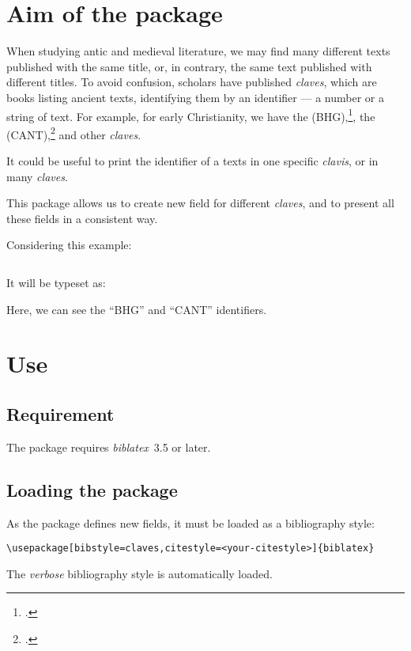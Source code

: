 \documentclass{ltxdockit}[2011/03/25]
\newcommand{\biblatex}{\emph{biblatex}\xspace}
\newcommand{\claves}{\emph{claves}\xspace}
\newcommand{\clavis}{\emph{clavis}\xspace}
\begin{document}
\printtitlepage
\tableofcontents


\section{Aim of the package}

When studying antic and medieval literature, we may find many different texts published with the same title, or, in contrary, the same text published with different titles.
To avoid confusion, scholars have published \claves, which are books listing ancient texts, identifying them by an identifier --- a number or a string of text.
For example, for early Christianity, we have the  (BHG),\footcites{BHG_3}{BHG_auctarium}{BHG_novum_auctarium}, the  (CANT),\footcite{CANT} and other \claves.
 
It could be useful to print the identifier of a texts in one specific \clavis, or in many \claves.

This package allows us to create new field for different \claves, and to present all these fields in a consistent way.
 
Considering this example:
\inputminted{tex}{biblatex-claves.bib}

It will be typeset as:
\begin{quotation}
\cite{BHG225}
\end{quotation}

Here, we can see the \enquote{BHG} and \enquote{CANT} identifiers.
 
\section{Use}

\subsection{Requirement}

The package requires \biblatex~3.5 or later.

\subsection{Loading the package}

As the package defines new fields, it must be loaded as a bibliography style:
\begin{verbatim}
\usepackage[bibstyle=claves,citestyle=<your-citestyle>]{biblatex}
\end{verbatim}
The \emph{verbose} bibliography style is automatically loaded.
\end{document}
